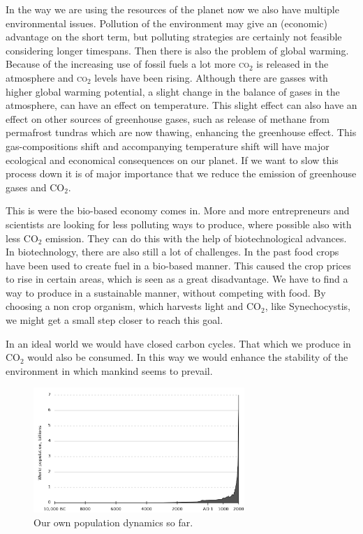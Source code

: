 \documentclass[12pt]{report}
\newcommand{\CO}[1]{\textsc{co}$_{#1}$}
\begin{document}
In the way we are using the resources of the planet now we also have multiple 
environmental issues. Pollution of the environment may give an (economic) 
advantage on the short term, but polluting strategies are certainly not feasible 
considering longer timespans. 
Then there is also the problem of global warming. Because of the increasing use 
of fossil fuels a lot more \CO2 is released in the atmosphere and \CO2 
levels have been rising. Although there are gasses with higher global warming 
potential, a slight change in the balance of gases in the atmosphere, can have 
an effect on temperature. This slight effect can also have an effect on other 
sources of greenhouse gases, such as release of methane from permafrost tundras 
which are now thawing, enhancing the greenhouse effect. This gas-compositions 
shift and accompanying temperature shift will have major ecological and 
economical consequences on our planet. If we want to slow this process down it 
is of major importance that we reduce the emission of greenhouse gases and 
CO$_2$.

This is were the bio-based economy comes in. More and more entrepreneurs and 
scientists are looking for less polluting ways to produce, where possible also 
with less CO$_2$ emission. They can do this with the help of biotechnological 
advances. In biotechnology, there are also still a lot of challenges. In the 
past food crops have been used to create fuel in a bio-based manner. This caused 
the crop prices to rise in certain areas, which is seen as a great disadvantage. 
We have to find a way to produce in a sustainable manner, without competing with 
food. By choosing a non crop organism, which harvests light and CO$_2$, like 
Synechocystis, we might get a small step closer to reach this goal. 

In an ideal world we would have closed carbon cycles. That which we produce in 
CO$_2$ would also be consumed. In this way we would enhance the stability of the 
environment in which mankind seems to prevail. 

\begin{figure}[!ht]
 \begin{center}  
  \includegraphics[width=8cm]{human_population_curve.png}
  \caption{Our own population dynamics so far.}
  \label{fig:owndyn}
 \end{center}
\end{figure}
\end{document}
